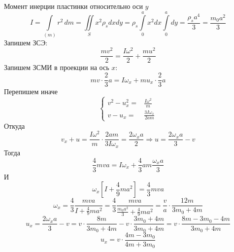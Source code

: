 \documentclass[a5paper,10pt]{article}
\begin{document}
Момент инерции пластинки относительно оси $y$
\begin{equation}
	I=\int\limits_{(m)}r^2\,dm=
	\iint\limits_S x^2 \rho_s dx dy=
	\rho_s\int\limits_0^a x^2dx\int\limits_0^a dy=\frac{\rho_sa^4}{3}=\frac{m_0a^2}{3}
\end{equation}
Запишем ЗСЭ:
\begin{equation}
	\label{eq1}
	\frac{mv^2}{2}=\frac{I\omega^2}{2}+\frac{mu^2}{2}
\end{equation}
Запишем ЗСМИ в проекции на ось $x$:
\begin{equation}
	mv\cdot\frac23a=I\omega_x+mu_x\cdot\frac23a
\end{equation}
Перепишем иначе
\begin{equation}
	\left\{\begin{aligned}
		v^2-u_x^2=&\frac{I\omega^2}{m}\\
		v-u_x=&\frac{3I\omega_x}{2am}
	\end{aligned}\right.
\end{equation}
Откуда
\begin{equation}
	v_x+u=\frac{I\omega^2}{m}\cdot\frac{2am}{3I\omega_x}=\frac{2\omega_x a}{2} \Rightarrow u=\frac{2\omega_x a}{3}-v
\end{equation}
Тогда
\begin{equation}
	\frac43mva=I\omega_x+\frac43am\frac{\omega_x a}{3}
\end{equation}
И
\begin{equation}
	\omega_x\left[I+\frac49ma^2\right]=\frac43mva
\end{equation}
\begin{equation}
	\omega_x=
		\frac43\frac{mva}{I+\frac49ma^2}=
		\frac43\frac{mva}{\frac{m_0a^2}{3}+\frac49ma^2}=\frac{v}{a}\cdot\frac{12m}{3m_0+4m}
\end{equation}
\begin{equation}
	u_x=\frac{2\omega_x a}{3}-v={v}\cdot\frac{8m}{3m_0+4m}-{v}\cdot\frac{3m_0+4m}{3m_0+4m}=v\cdot\frac{8m-3m_0-4m}{3m_0+4m}
\end{equation}
\begin{equation}
	u_x=v\cdot\frac{4m-3m_0}{4m+3m_0}
\end{equation}
\end{document}
